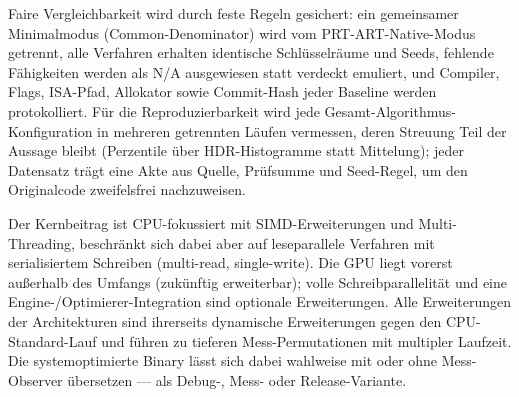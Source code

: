 Faire Vergleichbarkeit wird durch feste Regeln gesichert: ein gemeinsamer Minimalmodus
(Common-Denominator) wird vom PRT-ART-Native-Modus getrennt, alle Verfahren erhalten identische
Schlüsselräume und Seeds, fehlende Fähigkeiten werden als N/A ausgewiesen statt verdeckt emuliert,
und Compiler, Flags, ISA-Pfad, Allokator sowie Commit-Hash jeder Baseline werden protokolliert. Für
die Reproduzierbarkeit wird jede Gesamt-Algorithmus-Konfiguration in mehreren getrennten Läufen
vermessen, deren Streuung Teil der Aussage bleibt (Perzentile über HDR-Histogramme statt Mittelung);
jeder Datensatz trägt eine Akte aus Quelle, Prüfsumme und Seed-Regel, um den Originalcode
zweifelsfrei nachzuweisen.

Der Kernbeitrag ist CPU-fokussiert mit SIMD-Erweiterungen und Multi-Threading, beschränkt sich dabei
aber auf leseparallele Verfahren mit serialisiertem Schreiben (multi-read, single-write). Die GPU
liegt vorerst außerhalb des Umfangs (zukünftig erweiterbar); volle Schreibparallelität und eine
Engine-/Optimierer-Integration sind optionale Erweiterungen. Alle Erweiterungen der Architekturen
sind ihrerseits dynamische Erweiterungen gegen den CPU-Standard-Lauf und führen zu tieferen
Mess-Permutationen mit multipler Laufzeit. Die systemoptimierte Binary lässt sich dabei wahlweise
mit oder ohne Mess-Observer übersetzen --- als Debug-, Mess- oder Release-Variante.
